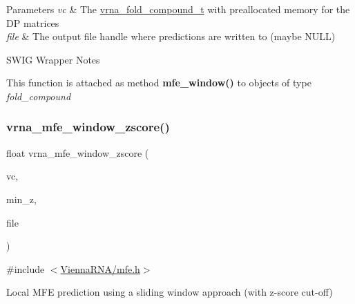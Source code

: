 \begin{DoxyParams}{Parameters}
{\em vc} & The \mbox{\hyperlink{group__fold__compound_ga1b0cef17fd40466cef5968eaeeff6166}{vrna\+\_\+fold\+\_\+compound\+\_\+t}} with preallocated memory for the DP matrices \\
\hline
{\em file} & The output file handle where predictions are written to (maybe N\+U\+LL)\\
\hline
\end{DoxyParams}
\begin{DoxyRefDesc}{S\+W\+I\+G Wrapper Notes}
\item[\mbox{\hyperlink{wrappers__wrappers000076}{S\+W\+I\+G Wrapper Notes}}]This function is attached as method {\bfseries mfe\+\_\+window()} to objects of type {\itshape fold\+\_\+compound} \end{DoxyRefDesc}
\mbox{\label{group__local__mfe__fold_gaa4f67ae94efd08d800c17f9b53423fd6}} 
\subsubsection{\texorpdfstring{vrna\+\_\+mfe\+\_\+window\+\_\+zscore()}{vrna\_mfe\_window\_zscore()}}
{\footnotesize\ttfamily float vrna\+\_\+mfe\+\_\+window\+\_\+zscore (\begin{DoxyParamCaption}\item[{\mbox{\hyperlink{group__fold__compound_ga1b0cef17fd40466cef5968eaeeff6166}{vrna\+\_\+fold\+\_\+compound\+\_\+t}} $\ast$}]{vc,  }\item[{double}]{min\+\_\+z,  }\item[{F\+I\+LE $\ast$}]{file }\end{DoxyParamCaption})}



{\ttfamily \#include $<$\mbox{\hyperlink{mfe_8h}{Vienna\+R\+N\+A/mfe.\+h}}$>$}



Local M\+FE prediction using a sliding window approach (with z-\/score cut-\/off) 

